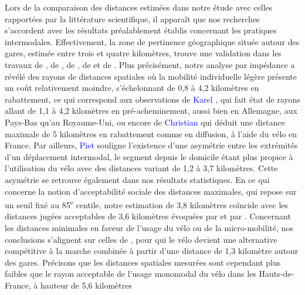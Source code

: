 \begin{refsegment}
Lors de la comparaison des distances estimées dans notre étude avec celles rapportées par la littérature scientifique, il apparaît que nos recherches s'accordent avec les résultats préalablement établis concernant les pratiques intermodales. Effectivement, la zone de pertinence géographique située autour des gares, estimée entre trois et quatre kilomètres, trouve une validation dans les travaux de \textcolor{blue}{\textcite[234]{keijer_how_2000}}, de \textcolor{blue}{\textcite[359]{givoni_access_2007}}, de \textcolor{blue}{\textcite[23]{debrezion_modelling_2009}}, de \textcolor{blue}{\textcite[213]{kager_characterisation_2016}} et de \textcolor{blue}{\textcite[42]{nielsen_bikeability_2018}}. Plus précisément, notre analyse par impédance a révélé des rayons de distances spatiales où la mobilité individuelle légère présente un coût relativement moindre, s'échelonnant de 0,8 à 4,2 kilomètres en rabattement, ce qui correspond aux observations de \textcolor{blue}{Karel} \textcolor{blue}{\textcite[282]{martens_bicycle_2004}}, qui fait état de rayons allant de 1,1 à 4,2 kilomètres en pré-acheminement, aussi bien en Allemagne, aux Pays-Bas qu'au Royaume-Uni, ou encore de \textcolor{blue}{Christian} \textcolor{blue}{\textcite[14]{gioria_etude_2016}} qui déduit une distance maximale de 5 kilomètres en rabattement comme en diffusion, à l'aide du vélo en France. Par ailleurs, \textcolor{blue}{Piet} \textcolor{blue}{\textcite[73]{rietveld_accessibility_2000}} souligne l'existence d'une asymétrie entre les extrémités d'un déplacement intermodal, le segment depuis le domicile étant plus propice à l'utilisation du vélo avec des distances variant de 1,2 à 3,7 kilomètres. Cette asymétrie se retrouve également dans nos résultats statistiques. En ce qui concerne la notion d'acceptabilité sociale des distances maximales, qui repose sur un seuil fixé au 85\textsuperscript{e} centile, notre estimation de 3,8 kilomètres coïncide avec les distances jugées acceptables de 3,6 kilomètres évoquées par \textcolor{blue}{\textcite[62]{rabaud_quand_2022}} et par \textcolor{blue}{\textcite[45]{la_paix_puello_modelling_2015}}. Concernant les distances minimales en faveur de l'usage du vélo ou de la micro-mobilité, nos conclusions s'alignent sur celles de \textcolor{blue}{\textcite[2]{rastogi_willingness_2010}}, pour qui le vélo devient une alternative compétitive à la marche combinée à partir d'une distance de 1,3 kilomètre autour des gares. Précisons que les distances spatiales mesurées sont cependant plus faibles que le rayon acceptable de l'usage monomodal du vélo dans les Hauts-de-France, à hauteur de 5,6 kilomètres 
\end{refsegment}
